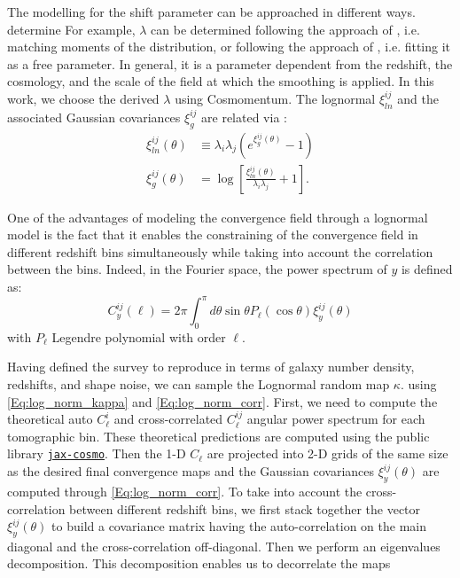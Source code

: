 \documentclass{aa}
\begin{document}
 The modelling for the shift parameter can be approached in different ways.  determine
For example, $\lambda$ can be determined following the approach of \citet{xavier2016improving} , i.e.  matching moments of the distribution, or following the approach of \citet{hilbert2011cosmic}, i.e. fitting it as a free parameter. In general, it is a parameter dependent from the redshift, the cosmology, and the scale of the field at which the smoothing is applied.
In this work, we choose the derived $\lambda$ using Cosmomentum.
The lognormal $\xi^{ij}_{ln}$ and the associated Gaussian covariances $ \xi^{ij}_g$ are related via :
\begin{align}
    \xi^{ij}_{ln}(\theta) & \equiv \lambda_i \lambda_j (e^{ \xi^{ij}_g(\theta)}-1) \nonumber \\ 
    \xi^{ij}_g(\theta)&=\log{\left[ \frac{\xi^{ij}_{ln}(\theta)}{\lambda_i \lambda_j}+1\right ]}. \label{Eq:log_norm_corr}
\end{align}

One of the advantages of modeling the convergence field through a lognormal model is the fact that it enables the constraining of the convergence field in different redshift bins simultaneously while taking into account the correlation between the bins. Indeed, in the Fourier space, the power spectrum of $y$ is defined as:
\begin{equation}\label{Eq:log_norm_cls}
    C^{ij}_y(\ell)=2\pi \int_0^{\pi} d\theta \sin{\theta}P_{\ell}(\cos{\theta})\xi^{ij}_{y}(\theta)
\end{equation}
with $P_{\ell}$ Legendre polynomial with order $\ell$. 

Having defined the survey to reproduce in terms of galaxy number density, redshifts, and shape noise, we can sample the Lognormal random map $\kappa$.  using \autoref{Eq:log_norm_kappa} and \autoref{Eq:log_norm_corr}.  First, we need to compute the theoretical auto $C_{\ell}^{i}$ and cross-correlated $C_{\ell}^{ij}$ angular power spectrum for each tomographic bin. These theoretical predictions are computed using the public library  \href{https://github.com/DifferentiableUniverseInitiative/jax_cosmo}{\texttt{jax-cosmo}}. Then the 1-D $C_{\ell}$ are projected into 2-D grids of the same size as the desired final convergence maps and the Gaussian covariances $\xi^{ij}_y(\theta)$ are computed through \autoref{Eq:log_norm_corr}. To take into account the cross-correlation between different redshift bins, we first stack together the vector $\xi^{ij}_y(\theta)$ to build a covariance matrix having the auto-correlation on the main diagonal and the cross-correlation off-diagonal. Then we perform an eigenvalues decomposition. This decomposition enables us to decorrelate the maps
\end{document}
